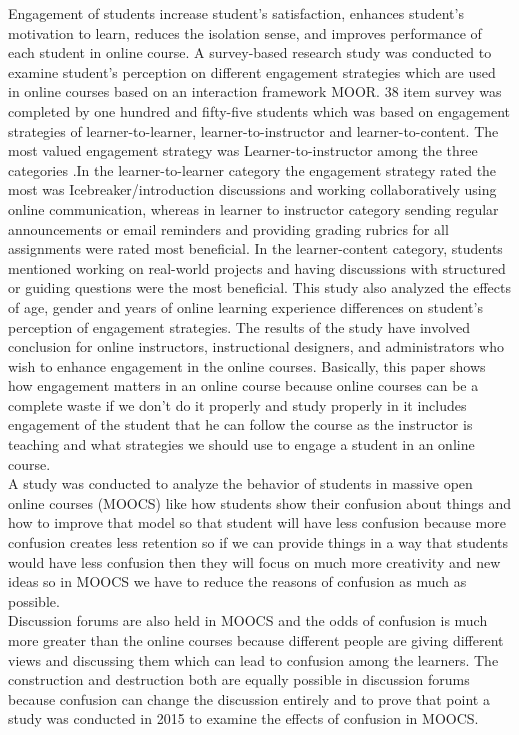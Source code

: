 Engagement of students increase student's satisfaction, enhances student's motivation to learn, reduces the isolation sense, and improves performance of each student in online course. A survey-based research study was conducted to examine student's perception on different engagement strategies which are used in online courses based on  an interaction framework MOOR. 38 item survey was completed by one hundred and fifty-five students which was based on engagement strategies of learner-to-learner, learner-to-instructor and learner-to-content. The most valued engagement strategy was Learner-to-instructor among the three categories .In the learner-to-learner category the engagement strategy rated the most was Icebreaker/introduction discussions and working collaboratively using online communication, whereas in learner to instructor category sending regular announcements or email reminders and providing grading rubrics for all assignments were rated most beneficial. In the learner-content category, students mentioned working on real-world projects and having discussions with structured or guiding questions were the most beneficial. This study also analyzed the effects of age, gender and years of online learning experience differences on student's perception of engagement strategies. The results of the study have involved conclusion for online instructors, instructional designers, and administrators who wish to enhance engagement in the online courses. Basically, this paper shows how engagement matters in an online course because online courses can be a complete waste if we don't do it properly and study properly in it includes engagement of the student that he can follow the course as the instructor is teaching and what strategies we should use to engage a student in an online course. \cite{Martin2018(2)}\\
A study was conducted to analyze the behavior of students in massive open online courses (MOOCS) like how students show their confusion about things and how to improve that model so that student will have less confusion because more confusion creates less retention so if we can provide things in a way that students would have less confusion then they will focus on much more creativity and new ideas so in MOOCS we have to reduce the reasons of confusion as much as possible.\cite{Yang2016}\\
Discussion forums are also held in MOOCS and the odds of confusion is much more greater than the online courses because different people are giving different views and discussing them which can lead to confusion among the learners. The construction and destruction both are equally possible in discussion forums because confusion can change the discussion entirely and to prove that point a study was conducted in 2015 to examine the effects of confusion in MOOCS.\cite{Yang2015}\\
